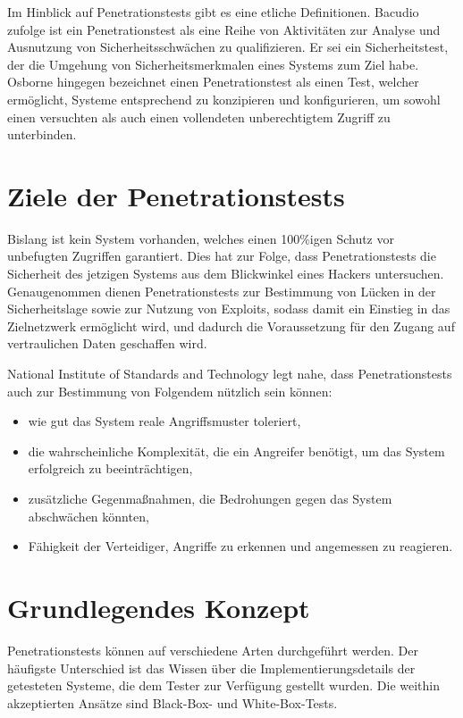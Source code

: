 Im Hinblick auf Penetrationstests gibt es eine etliche Definitionen. Bacudio\cite{bacudio2011overview} zufolge ist ein Penetrationstest als eine Reihe von Aktivitäten zur Analyse und Ausnutzung von Sicherheitsschwächen zu qualifizieren. Er sei ein Sicherheitstest, der die Umgehung von Sicherheitsmerkmalen eines Systems zum Ziel habe\cite{wack2003guideline}. Osborne\cite{osborne2006cheat} hingegen bezeichnet einen Penetrationstest als einen Test, welcher ermöglicht, Systeme entsprechend zu konzipieren und konfigurieren, um sowohl einen versuchten als auch einen vollendeten unberechtigtem Zugriff zu unterbinden.

\section{Ziele der Penetrationstests}

Bislang ist kein System vorhanden, welches einen 100\%igen Schutz vor unbefugten Zugriffen garantiert. Dies hat zur Folge, dass Penetrationstests die Sicherheit des jetzigen Systems aus dem Blickwinkel eines Hackers untersuchen. Genaugenommen dienen Penetrationstests zur Bestimmung von Lücken in der Sicherheitslage sowie zur Nutzung von Exploits, sodass damit ein Einstieg in das Zielnetzwerk ermöglicht wird, und dadurch die Voraussetzung für den  Zugang auf vertraulichen Daten geschaffen wird\cite{yeo2013using}.

National Institute of Standards and Technology legt nahe, dass Penetrationstests auch zur Bestimmung von Folgendem nützlich sein können\cite{scarfone2008technical}: 

\begin{itemize}
	\item wie gut das System reale Angriffsmuster toleriert,
	\item die wahrscheinliche Komplexität, die ein Angreifer benötigt, um das System erfolgreich zu beeinträchtigen,
	\item zusätzliche Gegenmaßnahmen, die Bedrohungen gegen das System abschwächen könnten,
	\item Fähigkeit der Verteidiger, Angriffe zu erkennen und angemessen zu reagieren.
\end{itemize}

\section{Grundlegendes Konzept}
\label{grndlgndkonzpt}

Penetrationstests können auf verschiedene Arten durchgeführt werden. Der häufigste Unterschied ist das Wissen über die Implementierungsdetails der getesteten Systeme, die dem Tester zur Verfügung gestellt wurden. Die weithin akzeptierten Ansätze sind Black-Box- und White-Box-Tests.

